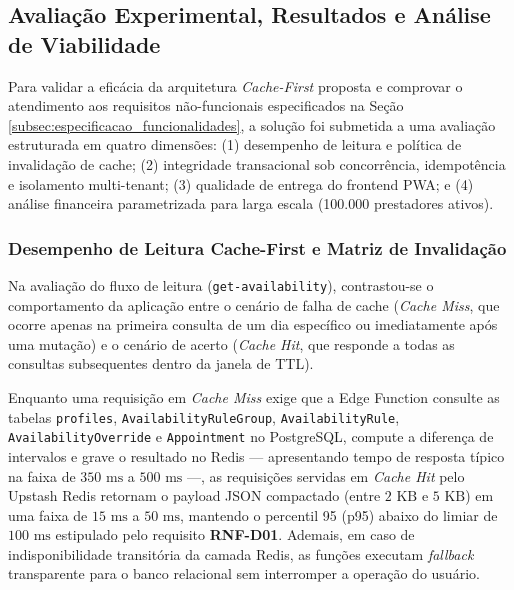 \documentclass[12pt,a4paper]{article}
\begin{document}

\subsection{Avaliação Experimental, Resultados e Análise de Viabilidade}
\label{subsec:avaliacao_resultados}

Para validar a eficácia da arquitetura \textit{Cache-First} proposta e comprovar o atendimento aos requisitos não-funcionais especificados na Seção \ref{subsec:especificacao_funcionalidades}, a solução foi submetida a uma avaliação estruturada em quatro dimensões: (1) desempenho de leitura e política de invalidação de cache; (2) integridade transacional sob concorrência, idempotência e isolamento multi-tenant; (3) qualidade de entrega do frontend PWA; e (4) análise financeira parametrizada para larga escala (100.000 prestadores ativos).

\subsubsection{Desempenho de Leitura Cache-First e Matriz de Invalidação}
\label{subsubsec:avaliacao_cache}

Na avaliação do fluxo de leitura (\texttt{get-availability}), contrastou-se o comportamento da aplicação entre o cenário de falha de cache (\textit{Cache Miss}, que ocorre apenas na primeira consulta de um dia específico ou imediatamente após uma mutação) e o cenário de acerto (\textit{Cache Hit}, que responde a todas as consultas subsequentes dentro da janela de TTL).

Enquanto uma requisição em \textit{Cache Miss} exige que a Edge Function consulte as tabelas \texttt{profiles}, \texttt{AvailabilityRuleGroup}, \texttt{AvailabilityRule}, \texttt{AvailabilityOverride} e \texttt{Appointment} no PostgreSQL, compute a diferença de intervalos e grave o resultado no Redis --- apresentando tempo de resposta típico na faixa de $350\text{ ms}$ a $500\text{ ms}$ ---, as requisições servidas em \textit{Cache Hit} pelo Upstash Redis retornam o payload JSON compactado (entre $2\text{ KB}$ e $5\text{ KB}$) em uma faixa de $15\text{ ms}$ a $50\text{ ms}$, mantendo o percentil 95 (p95) abaixo do limiar de $100\text{ ms}$ estipulado pelo requisito \textbf{RNF-D01}. Ademais, em caso de indisponibilidade transitória da camada Redis, as funções executam \textit{fallback} transparente para o banco relacional sem interromper a operação do usuário.
\end{document}
